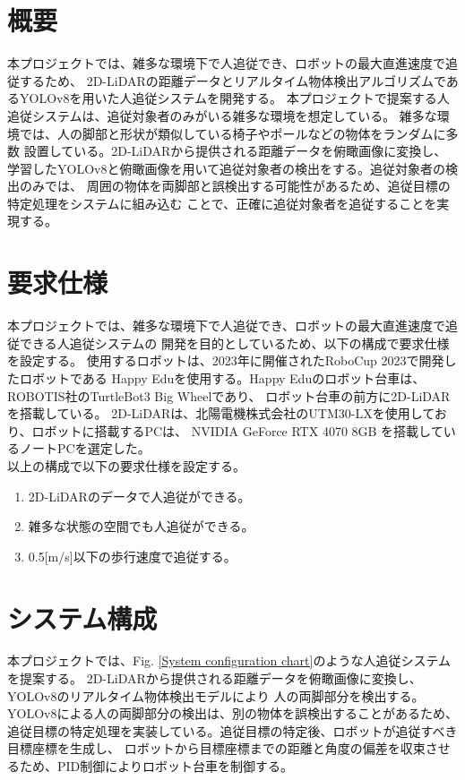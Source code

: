 \section{概要}
本プロジェクトでは、雑多な環境下で人追従でき、ロボットの最大直進速度で追従するため、
2D-LiDARの距離データとリアルタイム物体検出アルゴリズムであるYOLOv8を用いた人追従システムを開発する。
本プロジェクトで提案する人追従システムは、追従対象者のみがいる雑多な環境を想定している。
雑多な環境では、人の脚部と形状が類似している椅子やポールなどの物体をランダムに多数
設置している。2D-LiDARから提供される距離データを俯瞰画像に変換し、
学習したYOLOv8と俯瞰画像を用いて追従対象者の検出をする。追従対象者の検出のみでは、
周囲の物体を両脚部と誤検出する可能性があるため、追従目標の特定処理をシステムに組み込む
ことで、正確に追従対象者を追従することを実現する。

\section{要求仕様}
本プロジェクトでは、雑多な環境下で人追従でき、ロボットの最大直進速度で追従できる人追従システムの
開発を目的としているため、以下の構成で要求仕様を設定する。
使用するロボットは、2023年に開催されたRoboCup 2023で開発したロボットである
Happy Eduを使用する。Happy Eduのロボット台車は、ROBOTIS社のTurtleBot3 Big Wheelであり、
ロボット台車の前方に2D-LiDARを搭載している。
2D-LiDARは、北陽電機株式会社のUTM30-LXを使用しており、ロボットに搭載するPCは、
NVIDIA GeForce RTX 4070 8GB を搭載しているノートPCを選定した。\\ \indent
以上の構成で以下の要求仕様を設定する。\\

\begin{enumerate}
\item 2D-LiDARのデータで人追従ができる。
\item 雑多な状態の空間でも人追従ができる。
\item 0.5[m/s]以下の歩行速度で追従する。
\end{enumerate}

\section{システム構成}
本プロジェクトでは、Fig. \ref{System configuration chart}のような人追従システムを提案する。
2D-LiDARから提供される距離データを俯瞰画像に変換し、YOLOv8のリアルタイム物体検出モデルにより
人の両脚部分を検出する。YOLOv8による人の両脚部分の検出は、別の物体を誤検出することがあるため、
追従目標の特定処理を実装している。追従目標の特定後、ロボットが追従すべき目標座標を生成し、
ロボットから目標座標までの距離と角度の偏差を収束させるため、PID制御によりロボット台車を制御する。

